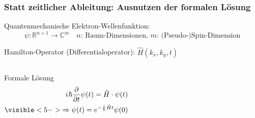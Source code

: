 \documentclass{beamer}
\newcommand{\iu}{{i\mkern1mu}} 	%
\begin{document}
\begin{frame}[t] %
  \frametitle{Statt zeitlicher Ableitung: Ausnutzen der formalen Lösung}
 Quantenmechanische Elektron-Wellenfunktion: \begin{equation*}\psi: \mathbb{R}^{n+1} \rightarrow \mathbb{C}^m \quad \text{$n$: Raum-Dimensionen, $m$: (Pseudo-)Spin-Dimension}\end{equation*}

 Hamilton-Operator (Differentialoperator): $\hat{H}(k_x, k_y, t)$

 \begin{columns}
 \begin{block}{Formale Lösung}
  \begin{align*}
    \iu \hbar \frac{\partial}{\partial t}  \psi(t) = \hat{H} \cdot \psi(t)  \\
    \visible<5->{\Rightarrow  \psi(t) = e^{-\frac{\iu}{\hbar}\hat{H}t} \psi(0)}
  \end{align*}
    \end{block}
    
     
  \end{columns}
\end{frame}
\end{document}
